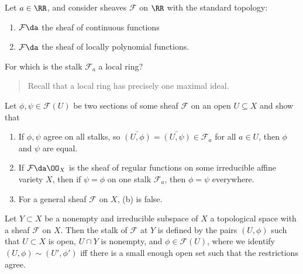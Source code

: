 \begin{problem}[Gathmann 3.21]

Let \(a\in \RR\), and consider sheaves \(\mathcal{F}\) on \(\RR\) with
the standard topology:

\begin{enumerate}
\def\labelenumi{\arabic{enumi}.}
\tightlist
\item
  \(\mathcal{F} \da\) the sheaf of continuous functions
\item
  \(\mathcal{F} \da\) the sheaf of locally polynomial functions.
\end{enumerate}

For which is the stalk \(\mathcal{F}_a\) a local ring?

\begin{quote}
Recall that a local ring has precisely one maximal ideal.
\end{quote}

\end{problem}

\begin{problem}[Gathmann 3.22]

Let \(\phi, \psi \in \mathcal{F}(U)\) be two sections of some sheaf
\(\mathcal{F}\) on an open \(U\subseteq X\) and show that

\begin{enumerate}
\def\labelenumi{\alph{enumi}.}
\item
  If \(\phi, \psi\) agree on all stalks, so
  \(\bar{(U, \phi)} = \bar{(U, \psi)} \in \mathcal{F}_a\) for all
  \(a\in U\), then \(\phi\) and \(\psi\) are equal.
\item
  If \(\mathcal{F} \da \OO_X\) is the sheaf of regular functions on some
  irreducible affine variety \(X\), then if \(\psi = \phi\) on one stalk
  \(\mathcal{F}_a\), then \(\phi = \psi\) everywhere.
\item
  For a general sheaf \(\mathcal{F}\) on \(X\), (b) is false.
\end{enumerate}

\end{problem}

\begin{definition}

Let \(Y\subset X\) be a nonempty and irreducible subspace of \(X\) a
topological space with a sheaf \(\mathcal{F}\) on \(X\). Then the stalk
of \(\mathcal{F}\) at \(Y\) is defined by the pairs \((U, \phi)\) such
that \(U\subset X\) is open, \(U\cap Y\) is nonempty, and
\(\phi \in \mathcal{F}(U)\), where we identify
\((U, \phi) \sim (U',\phi')\) iff there is a small enough open set such
that the restrictions agree.

\end{definition}


